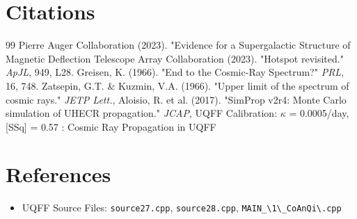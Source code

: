 \documentclass[12pt,a4paper]{article}
\begin{document}
\section*{Citations}
\begin{thebibliography}{99}
 Pierre Auger Collaboration (2023). "Evidence for a Supergalactic Structure of Magnetic Deflection
 Telescope Array Collaboration (2023). "Hotspot revisited." \emph{ApJL}, 949, L28.
 Greisen, K. (1966). "End to the Cosmic-Ray Spectrum?" \emph{PRL}, 16, 748.
 Zatsepin, G.T. \& Kuzmin, V.A. (1966). "Upper limit of the spectrum of cosmic rays." \emph{JETP Lett.},
 Aloisio, R. et al. (2017). "SimProp v2r4: Monte Carlo simulation of UHECR propagation." \emph{JCAP},
 UQFF Calibration: $\kappa$ = 0.0005/day, [SSq] = 0.57 : Cosmic Ray Propagation in UQFF
\end{thebibliography}

\section*{References}
\begin{itemize}
  \item[6.] UQFF Source Files: \texttt{source27.cpp}, \texttt{source28.cpp}, \texttt{MAIN\_\textbackslash {1\textbackslash \_CoAnQi\textbackslash }.cpp}
\end{itemize}

\end{document}
